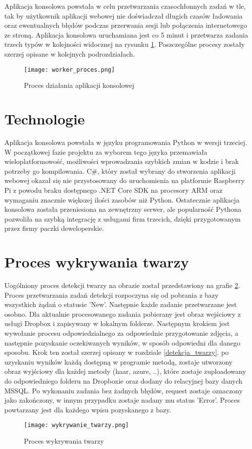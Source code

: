 Aplikacja konsolowa powstała w celu przetwarzania czasochłonnych zadań w tle, tak by użytkownik aplikacji webowej nie doświadczał długich czasów ładowania oraz ewentualnych błędów podczas przerwania sesji lub połączenia internetowego ze stroną. Aplikacja konsolowa uruchamiana jest co 5 minut i przetwarza zadania trzech typów w kolejności widocznej na rysunku \ref{fig:worker_proces}. Poszczególne procesy zostały szerzej opisane w kolejnych podrozdziałach.
\begin{figure}[H]
	\centering
	\texttt{[image: worker\_proces.png]}
	\caption{Proces działania aplikacji konsolowej}
	\label{fig:worker_proces}
\end{figure}

\section{Technologie}
Aplikacja konsolowa powstała w języku programowania Python w wersji trzeciej. W początkowej fazie projektu za wyborem tego języka przemawiała wieloplatformowość, możliwości wprowadzania szybkich zmian w kodzie i brak potrzeby go kompilowania. C\#, który został wybrany do stworzenia aplikacji webowej okazał się nie przystosowany do uruchomienia na platformie Raspberry Pi z powodu braku dostępnego .NET Core SDK na procesory ARM oraz wymaganiu znacznie większej ilości zasobów niż Python. Ostatecznie aplikacja konsolowa została przeniesiona na zewnętrzny serwer, ale popularność Pythona pozwoliła na szybką integrację z usługami firm trzecich, dzięki przygotowanym przez firmy paczki deweloperskie.

\section{Proces wykrywania twarzy}
Uogólniony proces detekcji twarzy na obrazie został przedstawiony na grafie \ref{fig:wykrywanie_proces}.
Proces przetwarzania zadań detekcji rozpoczyna się od pobrania z bazy wszystkich żądań o statusie 'New'. Następnie każde zadanie przetwarzane jest osobno. Dla aktualnie procesowanego zadania pobierany jest obraz wejściowy z usługi Dropbox i zapisywany w lokalnym folderze. Następnym krokiem jest wywołanie procesu odpowiedzialnego za odpowiednie przygotowanie zdjęcia, a następnie pozyskanie oczekiwanych wyników, w sposób odpowiedni dla danego sposobu. Krok ten został szerzej opisany w rozdziale \ref{detekcja_twarzy}. po uzyskaniu wyników każdą dostępną w programie metodą, zostaje utworzony obraz wyjściowy dla każdej metody (haar, azure, ..), które zostaje zuploadowany do odpowiedniego folderu na Dropboxie oraz dodany do relacyjnej bazy danych MSSQL. Po wykonaniu zadania bez żadnych błędów, request zostaje oznaczony jako zakończony, w innym przypadku zostaje nadany mu status 'Error'. Proces powtarzany jest dla każdego wpisu pozyskanego z bazy.
\begin{figure}[H]
	\centering
	\texttt{[image: wykrywanie\_twarzy.png]}
	\caption{Proces wykrywania twarzy}
	\label{fig:wykrywanie_proces}
\end{figure}

